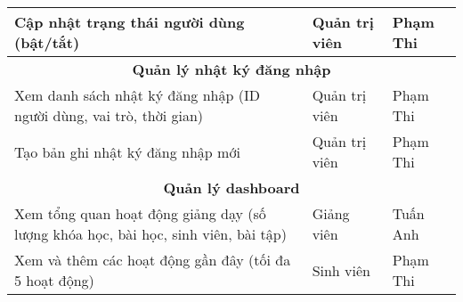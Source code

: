 \begin{longtable}{|p{8cm}|p{3cm}|p{2cm}|}
Cập nhật trạng thái người dùng (bật/tắt) & Quản trị viên & Phạm Thi\\ \hline
\multicolumn{3}{|c|}{\textbf{Quản lý nhật ký đăng nhập}} \\ \hline
Xem danh sách nhật ký đăng nhập (ID người dùng, vai trò, thời gian) & Quản trị viên & Phạm Thi\\ \hline
Tạo bản ghi nhật ký đăng nhập mới & Quản trị viên & Phạm Thi\\ \hline
\multicolumn{3}{|c|}{\textbf{Quản lý dashboard}} \\ \hline
Xem tổng quan hoạt động giảng dạy (số lượng khóa học, bài học, sinh viên, bài tập) & Giảng viên & Tuấn Anh\\ \hline
Xem và thêm các hoạt động gần đây (tối đa 5 hoạt động) & Sinh viên & Phạm Thi\\ \hline
\end{longtable}